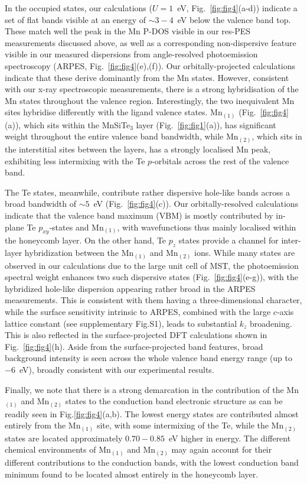 \documentclass[preprint,amsmath,amssymb,aps,nofootinbib,superscriptaddress]{revtex4-2}
\begin{document}
In the occupied states, our calculations ($U=1$~eV, Fig.~\ref{fig:fig4}(a-d)) indicate a set of flat bands visible at an energy of $\sim\!3-4$~eV below the valence band top. These match well the peak in the Mn P-DOS visible in our res-PES measurements discussed above, as well as a corresponding non-dispersive feature visible in our measured dispersions from angle-resolved photoemission spectroscopy (ARPES, Fig.~\ref{fig:fig4}(e),(f)). Our orbitally-projected calculations indicate that these derive dominantly from the Mn states. However, consistent with our x-ray spectroscopic measurements, there is a strong hybridisation of the Mn states throughout the valence region. Interestingly, the two inequivalent Mn sites hybridise differently with the ligand valence states. Mn$_{(1)}$ (Fig.~\ref{fig:fig4}(a)), which sits within the MnSiTe$_3$ layer (Fig.~\ref{fig:fig1}(a)), has significant weight throughout the entire valence band bandwidth, while Mn$_{(2)}$, which sits in the interstitial sites between the layers, has a strongly localised Mn peak, exhibiting less intermixing with the Te $p$-orbitals across the rest of the valence band.

The Te states, meanwhile, contribute rather dispersive hole-like bands across a broad bandwidth of $\sim5$~eV (Fig.~\ref{fig:fig4}(c)). Our orbitally-resolved calculations indicate that the valence band maximum (VBM) is mostly contributed by in-plane Te $p_{xy}$-states and Mn$_{(1)}$, with wavefunctions thus mainly localised within the honeycomb layer. On the other hand, Te $p_z$ states provide a channel for inter-layer hybridization between the Mn$_{(1)}$ and Mn$_{(2)}$ ions. While many states are observed in our calculations due to the large unit cell of MST, the photoemission spectral weight enhances two such dispersive states (Fig.~\ref{fig:fig4}(e-g)), with the hybridized hole-like dispersion appearing rather broad in the ARPES measurements. This is consistent with them having a three-dimensional character, while the surface sensitivity intrinsic to ARPES, combined with the large $c$-axis lattice constant (see supplementary Fig.S1), leads to substantial $k_z$ broadening. This is also reflected in the surface-projected DFT calculations shown in Fig.~\ref{fig:fig4}(h). Aside from the surface-projected band features, broad background intensity is seen across the whole valence band energy range (up to $-6$~eV), broadly consistent with our experimental results. 

Finally, we note that there is a strong demarcation in the contribution of the Mn$_{(1)}$ and Mn$_{(2)}$ states to the conduction band electronic structure as can be readily seen in Fig.\ref{fig:fig4}(a,b). The lowest energy states are contributed almost entirely from the Mn$_{(1)}$ site, with some intermixing of the Te, while the Mn$_{(2)}$ states are located approximately $0.70-0.85$~eV higher in energy. The different chemical environments of Mn$_{(1)}$ and Mn$_{(2)}$ may again account for their different contributions to the conduction bands, with the lowest conduction band minimum found to be located almost entirely in the honeycomb layer. 
\end{document}
